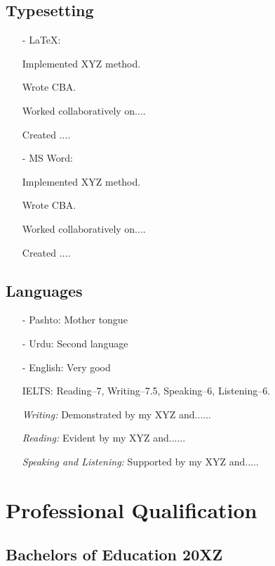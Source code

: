 \documentclass[11pt]{article}
\begin{document}
    \subsection{Typesetting}
    \begin{itemize}
        \item[-] \textcolor{Sepia}{\LaTeX}: 
        \item[\checkmark] Implemented XYZ method. 
        \item[\checkmark] Wrote CBA. 
        \item[\checkmark] Worked collaboratively on.... 
        \item[\checkmark] Created ....
        \item[-] \textcolor{Sepia}{MS Word}:  
        \item[\checkmark] Implemented XYZ method. 
        \item[\checkmark] Wrote CBA. 
        \item[\checkmark] Worked collaboratively on.... 
        \item[\checkmark] Created ....
    \end{itemize}
    \subsection{Languages}
    \begin{itemize}
        \item[-] \textcolor{Sepia}{Pashto}: Mother tongue
        \item[-] \textcolor{Sepia}{Urdu}: Second language
        \item[-] \textcolor{Sepia}{English}: Very good
            \item[\checkmark] IELTS: Reading--7, Writing--7.5, Speaking--6, Listening--6.
            \item[\checkmark] \textit{Writing:}  Demonstrated by my XYZ and......
            \item[\checkmark] \textit{Reading:}  Evident by my XYZ and......
            \item[\checkmark] \textit{Speaking and Listening:} Supported by my XYZ and.....
        \end{itemize}
    
    \section{Professional Qualification}
    \subsection{Bachelors of Education \hfill \normalfont 20XZ}
\end{document}
